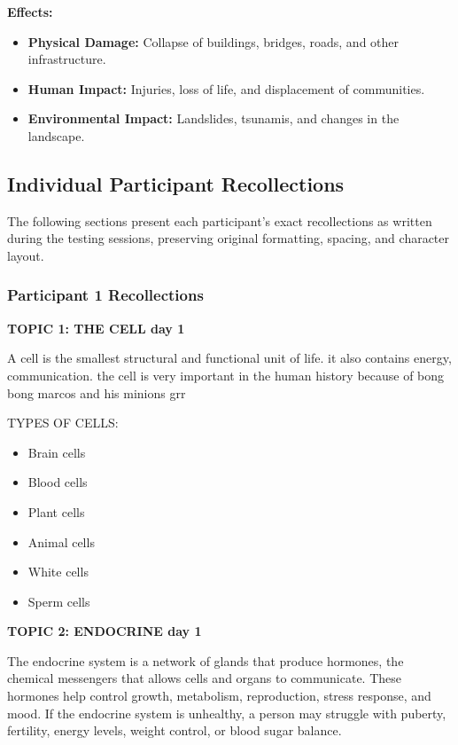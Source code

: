 {{\textbf{Effects:}
\begin{itemize}
    \item \textbf{Physical Damage:} Collapse of buildings, bridges, roads, and other infrastructure.
    \item \textbf{Human Impact:} Injuries, loss of life, and displacement of communities.
    \item \textbf{Environmental Impact:} Landslides, tsunamis, and changes in the landscape.
\end{itemize}
}

\subsection{Individual Participant Recollections}

The following sections present each participant's exact recollections as written during the testing sessions, preserving original formatting, spacing, and character layout.

\subsubsection{Participant 1 Recollections}

{\footnotesize
\textbf{TOPIC 1: THE CELL  day 1}


A cell is the smallest structural and functional unit of life. it also contains energy, communication. the cell is very important in the human history because of bong bong marcos and his minions grr


TYPES OF CELLS:
\begin{itemize}
    \item Brain cells
    \item Blood cells
    \item Plant cells
    \item Animal cells
    \item White cells
    \item Sperm cells
\end{itemize}

\textbf{TOPIC 2: ENDOCRINE day 1}
 
The endocrine system is a network of glands that produce hormones, the chemical messengers that allows cells and organs to communicate. These hormones help control growth, metabolism, reproduction, stress response, and mood. If the endocrine system is unhealthy, a person may struggle with puberty, fertility, energy levels, weight control, or blood sugar balance.


}}
